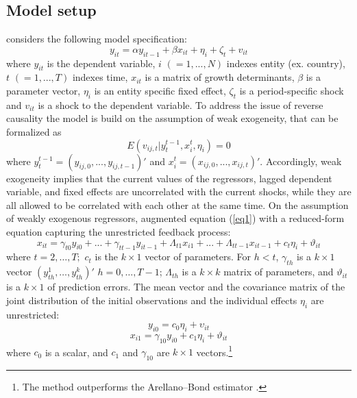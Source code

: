 \documentclass[a4paper]{article}
\begin{document}
\subsection{Model setup}
\noindent \citet{Moral+2016} considers the following model specification:
\begin{equation}\label{eq1}
    y_{it}=\alpha y_{it-1}+\beta x_{it}+\eta_{i}+\zeta_{t}+v_{it}
\end{equation}
\noindent where $y_{it}$ is the dependent variable, $i$ $(=1,...,N)$ indexes entity (ex. country), $t$ $(=1,...,T)$ indexes time, $x_{it}$ is a matrix of growth determinants, $\beta$ is a parameter vector, $\eta_{i}$ is an entity specific fixed effect, $\zeta_{t}$ is a period-specific shock and $v_{it}$ is a shock to the dependent variable.
To address the issue of reverse causality the model is build on the assumption of weak exogeneity, that can be formalized as
\begin{equation}\label{eq2}
    E(v_{ij,t}|y^{t-1}_{t},x^{t}_{i},\eta_{i})=0
\end{equation}
\noindent where $y^{t-1}_{t}=(y_{ij,0},...,y_{ij,t-1})'$ and $x^t_{i}=(x_{ij,0},...,x_{ij,t})'$.
Accordingly, weak exogeneity implies that the current values of the regressors, lagged dependent variable, and fixed effects are uncorrelated with the current shocks, while they are all allowed to be correlated with each other at the same time.
On the assumption of weakly exogenous regressors, \citet{Moral+2013} augmented equation (\ref{eq1}) with a reduced-form equation capturing the unrestricted feedback process:
\begin{equation}\label{eq3}
x_{it}=\gamma_{t0}y_{i0}+...+\gamma_{tt-1}y_{it-1}+\Lambda_{t1}x_{i1}+...+\Lambda_{tt-1}x_{it-1}+c_{t}\eta_{i}+\vartheta_{it}
\end{equation}
\noindent where $t=2,\dots ,T;$ $c_{t}$ is the $k\times 1$ vector of parameters.
For $h<t$, $\gamma_{th}$ is a $k\times 1$ vector $(y_{th}^{1},\dots,y_{th}^{k})'$  $h=0,\dots,T-1$; $\Lambda_{th}$ is a $k\times k$ matrix of parameters, and $\vartheta_{it}$ is a $k\times 1$ of prediction errors.
The mean vector and the covariance matrix of the joint distribution of the initial observations and the individual effects $\eta_{i}$ are unrestricted:
\begin{equation}\label{eq4}
    y_{i0}=c_{0}\eta_{i}+\upsilon_{it}
\end{equation}
\begin{equation}\label{eq5}
    x_{i1}=\gamma_{10}y_{i0}+c_{1}\eta_{i}+\vartheta_{it}
\end{equation}
\noindent where $c_{0}$ is a scalar, and $c_{1}$ and $\gamma_{10}$ are $k\times 1$ vectors.\footnote{The method outperforms the Arellano--Bond estimator \citep{Moral+2019}.}
\end{document}
